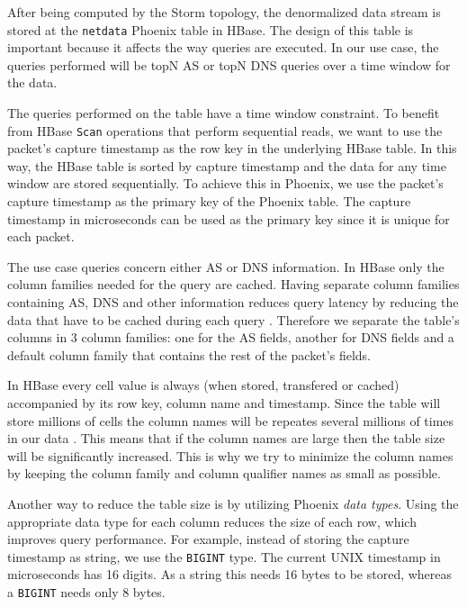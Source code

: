 After being computed by the Storm topology, the denormalized data stream is stored at the \texttt{netdata} Phoenix table in HBase. The design of this table is important because it affects the way queries are executed. In our use case, the queries performed will be topN AS or topN DNS queries over a time window for the data. 

The queries performed on the table have a time window constraint. To benefit from HBase \texttt{Scan} operations that perform sequential reads, we want to use the packet's capture timestamp as the row key in the underlying HBase table. In this way, the HBase table is sorted by capture timestamp and the data for any time window are stored sequentially. To achieve this in Phoenix, we use the packet's capture timestamp as the primary key of the Phoenix table. The capture timestamp in microseconds can be used as the primary key since it is unique for each packet.

The use case queries concern either AS or DNS information. In HBase only the column families needed for the query are cached. Having separate column families containing AS, DNS and other information reduces query latency by reducing the data that have to be cached during each query \cite{hbase_reference}. Therefore we separate the table's columns in 3 column families: one for the AS fields, another for DNS fields and a default column family that contains the rest of the packet's fields.

In HBase every cell value is always (when stored, transfered or cached) accompanied by its row key, column name and timestamp. Since the table will store millions of cells the column names will be repeates several millions of times in our data \cite{hbase_reference}. This means that if the column names are large then the table size will be significantly increased. This is why we try to minimize the column names by keeping the column family and column qualifier names as small as possible.

Another way to reduce the table size is by utilizing Phoenix \emph{data types}. Using the appropriate data type for each column reduces the size of each row, which improves query performance. For example, instead of storing the capture timestamp as string, we use the \texttt{BIGINT} type. The current UNIX timestamp in microseconds has 16 digits. As a string this needs 16 bytes to be stored, whereas a \texttt{BIGINT} needs only 8 bytes.

